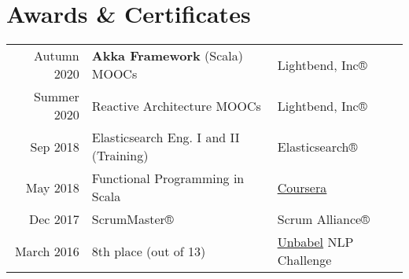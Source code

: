 \documentclass[letterpaper]{deedy-resume} %
\begin{document}
\begin{minipage}[t]{0.64\textwidth}
\vspace{\topsep}

\section{Awards \& Certificates} 
\begin{tabular}{rll}
Autumn 2020   & \textbf{Akka Framework} (Scala) MOOCs              & Lightbend, Inc® \\
Summer 2020   & Reactive Architecture MOOCs              & Lightbend, Inc® \\
Sep 2018   & Elasticsearch Eng. I and II (Training)              & Elasticsearch® \\
May 2018         & Functional Programming in Scala              & \href{https://www.coursera.org/account/accomplishments/verify/N4KVKVTZBQD2}{\underline{Coursera}}          \\
Dec 2017         & ScrumMaster®                                 & Scrum Alliance®   \\             
March 2016		 & 8th place (out of 13)                        & \href{https://unbabel.com/}{\underline{Unbabel}} NLP Challenge \\

\end{tabular}


\end{minipage} %




\end{document}
